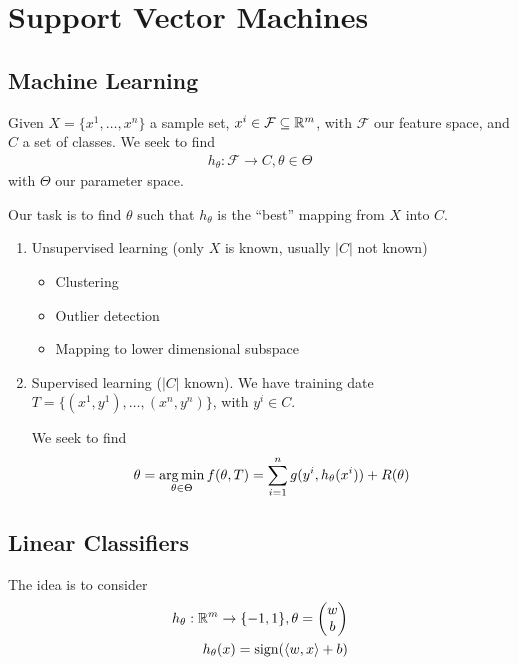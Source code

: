 \chapter{Support Vector Machines}
\label{cha:supp-vect-mach}

\section{Machine Learning}
\label{sec:machine-learning}

Given $X = \{ x^{1}, \dots, x^{n} \}$ a sample set, $x^{i} \in
\mathcal{F} \subseteq \mathbb{R}^{m}$, with $\mathcal{F}$ our feature space,
and $C$ a set of classes.  We seek to find
\begin{align}
  \label{eq:89}
  h_{\theta}: \mathcal{F} \rightarrow C, \theta \in \Theta
\end{align} with $\Theta$ our parameter space.

Our task is to find $\theta$ such that $h_{\theta}$ is the ``best''
mapping from $X$ into $C$.

\begin{enumerate}
\item Unsupervised learning (only $X$ is known, usually $|C|$ not known)
  \begin{itemize}
  \item Clustering
  \item Outlier detection
  \item Mapping to lower dimensional subspace
  \end{itemize}
\item Supervised learning ($|C|$ known).  We have training date $T =
  \{ (x^{1}, y^{1}), \dots, (x^{n}, y^{n}) \}$, with $y^{i} \in C$.

  We seek to find
  \begin{align}
    \label{eq:90}
    \theta = \operatorname*{arg\,min}_{\theta \in \Theta} f(\theta, T) = \sum_{i=1}^{n}
    g(y^{i}, h_{\theta}(x^{i})) + R(\theta)
  \end{align}
\end{enumerate}

\section{Linear Classifiers}
\label{sec:linear-classifiers}

The idea is to consider
\begin{align}
  \label{eq:91}
  h_{\theta}: \R^{m} \rightarrow \{ -1, 1 \}, \theta =
  \begin{pmatrix}
    w \\
    b
  \end{pmatrix} \\
  h_{\theta}(x) = \sign (\IP{w, x} + b)
\end{align}

